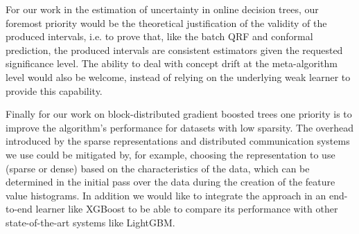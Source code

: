 For our work in the estimation of uncertainty in online decision trees, our foremost
priority would be the theoretical justification of the validity of the produced intervals,
i.e. to prove that, like the batch QRF and conformal prediction, the produced intervals
are consistent estimators given the requested significance level. The ability to
deal with concept drift at the meta-algorithm level would also be welcome, instead
of relying on the underlying weak learner to provide this capability.

Finally for our work on block-distributed gradient boosted trees one priority is to
improve the algorithm's performance for datasets with low sparsity. The overhead
introduced by the sparse representations and distributed communication systems we use could be mitigated by,
for example, choosing the representation to use (sparse or dense) based on the
characteristics of the data, which can be determined in the initial pass over the
data during the creation of the feature value histograms. In addition we would
like to integrate the approach in an end-to-end learner like XGBoost to be able
to compare its performance with other state-of-the-art systems like LightGBM.
